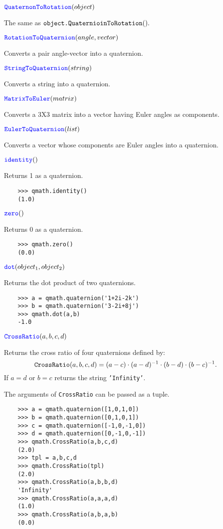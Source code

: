 \documentclass[11pt]{paper}
\begin{document}
\medskip
\noindent $\textcolor{blue}{\texttt{\mbox{QuaternonToRotation}}}(object)$ 

The same as $\texttt{\mbox{object.QuaternioinToRotation}}().$

\medskip
\noindent $\textcolor{blue}{\texttt{\mbox{RotationToQuaternion}}}(angle,vector)$ 

Converts a pair angle-vector into a quaternion.


\medskip
\noindent $\textcolor{blue}{\texttt{\mbox{StringToQuaternion}}}(string)$ 

Converts a string into a quaternion.

\medskip
\noindent $\textcolor{blue}{\texttt{\mbox{MatrixToEuler}}}(matrix)$ 

Converts a 3X3 matrix into a vector having Euler angles as components.

\medskip
\noindent $\textcolor{blue}{\texttt{\mbox{EulerToQuaternion}}}(list)$ 

Converts a vector whose components are Euler angles into a quaternion.
    

\medskip
\noindent $\textcolor{blue}{\texttt{\mbox{identity}}}()$ 

Returns 1 as a quaternion.
\begin{verbatim}
    >>> qmath.identity()
    (1.0)
\end{verbatim}
\medskip
\noindent $\textcolor{blue}{\texttt{\mbox{zero}}}()$ 

Returns 0 as a quaternion.
\begin{verbatim}
    >>> qmath.zero()
    (0.0)
\end{verbatim}

\medskip
\noindent $\textcolor{blue}{\texttt{\mbox{dot}}}(object_1,object_2)$ 

Returns the dot product of two quaternions.
\begin{verbatim}
    >>> a = qmath.quaternion('1+2i-2k')
    >>> b = qmath.quaternion('3-2i+8j')
    >>> qmath.dot(a,b)
    -1.0
\end{verbatim}

\medskip


\noindent $\textcolor{blue}{\texttt{\mbox{CrossRatio}}}(a,b,c,d)$ 

Returns the cross ratio of four quaternions defined by:
$$
{\texttt{\mbox{CrossRatio}}}(a,b,c,d) = (a-c)\cdot(a-d)^{-1}\cdot(b-d)\cdot(b-c)^{-1}.
$$ 
If $a = d$ or $b = c$ returns the string \texttt{\mbox{'Infinity'}}.

The arguments of {\texttt{\mbox{CrossRatio}}} can be passed as a tuple.
\begin{verbatim}
    >>> a = qmath.quaternion([1,0,1,0])
    >>> b = qmath.quaternion([0,1,0,1])
    >>> c = qmath.quaternion([-1,0,-1,0])
    >>> d = qmath.quaternion([0,-1,0,-1])
    >>> qmath.CrossRatio(a,b,c,d)
    (2.0)
    >>> tpl = a,b,c,d
    >>> qmath.CrossRatio(tpl)
    (2.0)
    >>> qmath.CrossRatio(a,b,b,d)
    'Infinity'
    >>> qmath.CrossRatio(a,a,a,d)
    (1.0)
    >>> qmath.CrossRatio(a,b,a,b)
    (0.0)
\end{verbatim}
\medskip
\end{document}
